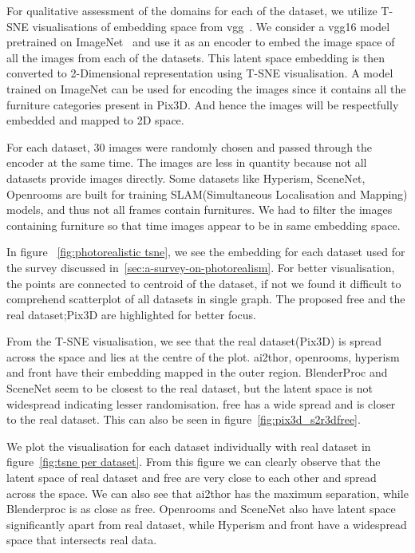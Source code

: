 For qualitative assessment of the domains for each of the dataset, we utilize T-SNE visualisations of embedding space from \gls{vgg}~\cite{simonyan2015deep}.
We consider a \gls{vgg}16 model pretrained on ImageNet~\cite{Deng2009ImageNetAL} and use it as an encoder to embed the image space of all the images from each of the datasets.
This latent space embedding is then converted to 2-Dimensional representation using T-SNE visualisation.
A model trained on ImageNet can be used for encoding the images since it contains all the furniture categories present in Pix3D\@.
And hence the images will be respectfully embedded and mapped to 2D space.

For each dataset, 30 images were randomly chosen and passed through the encoder at the same time.
The images are less in quantity because not all datasets provide images directly.
Some datasets like Hyperism, SceneNet, Openrooms are built for training SLAM(Simultaneous Localisation and Mapping) models, and thus not all frames contain furnitures.
We had to filter the images containing furniture so that time images appear to be in same embedding space.

In figure ~\ref{fig:photorealistic tsne}, we see the embedding for each dataset used for the survey discussed in~\ref{sec:a-survey-on-photorealism}.
For better visualisation, the points are connected to centroid of the dataset,
if not we found it difficult to comprehend scatterplot of all datasets in single graph.
The proposed \gls{free} and the real dataset;Pix3D are highlighted for better focus.

From the T-SNE visualisation, we see that the real dataset(Pix3D) is spread across the space and lies at the centre of the plot.
\gls{ai2thor}, openrooms, hyperism and \gls{front} have their embedding mapped in the outer region.
BlenderProc and SceneNet seem to be closest to the real dataset, but the latent space is not widespread indicating lesser randomisation.
\gls{free} has a wide spread and is closer to the real dataset.
This can also be seen in figure~\ref{fig:pix3d_s2r3dfree}.

We plot the visualisation for each dataset individually with real dataset in figure~\ref{fig:tsne per dataset}.
From this figure we can clearly observe that the latent space of real dataset and \gls{free} are very close to each other and spread across the space.
We can also see that \gls{ai2thor} has the maximum separation, while Blenderproc is as close as \gls{free}.
Openrooms and SceneNet also have latent space significantly apart from real dataset, while Hyperism and \gls{front} have a widespread space that intersects real data.


